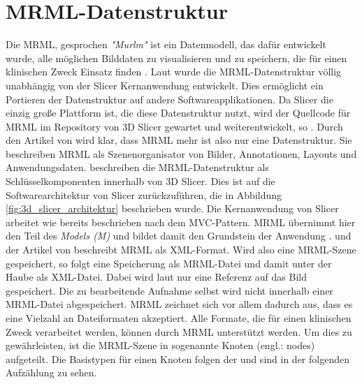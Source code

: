 \section{MRML-Datenstruktur}
\label{subsec:mrml_datenstruktur} Die \ac{MRML}, gesprochen \textit{"Murlm"} ist
ein Datenmodell, das dafür entwickelt wurde, alle möglichen Bilddaten zu visualisieren
und zu speichern, die für einen klinischen Zweck Einsatz finden \citep[vgl.][]{slicer2024}.
Laut \citet{slicer2024} wurde die \ac{MRML}-Datenstruktur völlig unabhängig von
der Slicer Kernanwendung entwickelt. Dies ermöglicht ein Portieren der Datenstruktur
auf andere Softwareapplikationen. Da Slicer die einzig große Plattform ist, die diese
Datenstruktur nutzt, wird der Quellcode für \ac{MRML} im Repository von 3D Slicer
gewartet und weiterentwickelt, so \citet{slicer2024}. Durch den Artikel von
\citet[S.~1331]{fedorov2012slicer} wird klar, dass \ac{MRML} mehr ist also nur eine
Datenstruktur. Sie beschreiben \ac{MRML} als Szenenorganisator von Bilder,
Annotationen, Layouts und Anwendungsdaten. \citet[S.~1327]{fedorov2012slicer} beschreiben
die \ac{MRML}-Datenstruktur als Schlüsselkomponenten innerhalb von 3D Slicer. Dies
ist auf die Softwarearchitektur von Slicer zurückzuführen, die in Abbildung
\ref{fig:3d_slicer_architektur} beschrieben wurde. Die Kernanwendung von Slicer arbeitet
wie bereits beschrieben nach dem \ac{MVC}-Pattern. \ac{MRML} übernimmt hier den
Teil des \textit{Models (M)} und bildet damit den Grundstein der Anwendung \citep[vgl.][S.~1332]{fedorov2012slicer}.
\citet{slicer2024} und der Artikel von \citet[S.~1327]{fedorov2012slicer} beschreibt
\ac{MRML} als \ac{XML}-Format. Wird also eine \ac{MRML}-Szene gespeichert, so
folgt eine Speicherung als \ac{MRML}-Datei und damit unter der Haube als \ac{XML}-Datei.
Dabei wird laut \citet{slicer2024} nur eine Referenz auf das Bild gespeichert. Die
zu bearbeitende Aufnahme selbst wird nicht innerhalb einer \ac{MRML}-Datei
abgespeichert. \ac{MRML} zeichnet sich vor allem dadurch aus, dass es eine Vielzahl
an Dateiformaten akzeptiert. Alle Formate, die für einen klinischen Zweck verarbeitet
werden, können durch \ac{MRML} unterstützt werden. Um dies zu gewährleisten, ist
die \ac{MRML}-Szene in sogenannte Knoten (engl.: nodes) aufgeteilt. Die Basistypen
für einen Knoten folgen der \citet{slicer2024} und sind in der folgenden
Aufzählung zu sehen.


